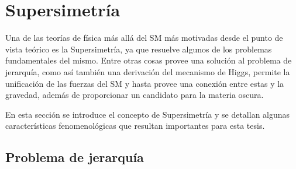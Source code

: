 \section{Supersimetría}
\label{cap:susy}

Una de las teorías de física más allá del SM más motivadas desde el punto de
vista teórico es la Supersimetría, ya que resuelve algunos de los problemas
fundamentales del mismo. Entre otras cosas provee una solución al problema de
jerarquía, como así también una derivación del mecanismo de Higgs, permite la
unificación de las fuerzas del SM y hasta provee una conexión entre estas y la
gravedad, además de proporcionar un candidato para la materia oscura.


En esta sección se introduce el concepto de Supersimetría y se detallan algunas
características fenomenológicas que resultan importantes para esta tesis.


\subsection{Problema de jerarquía}

